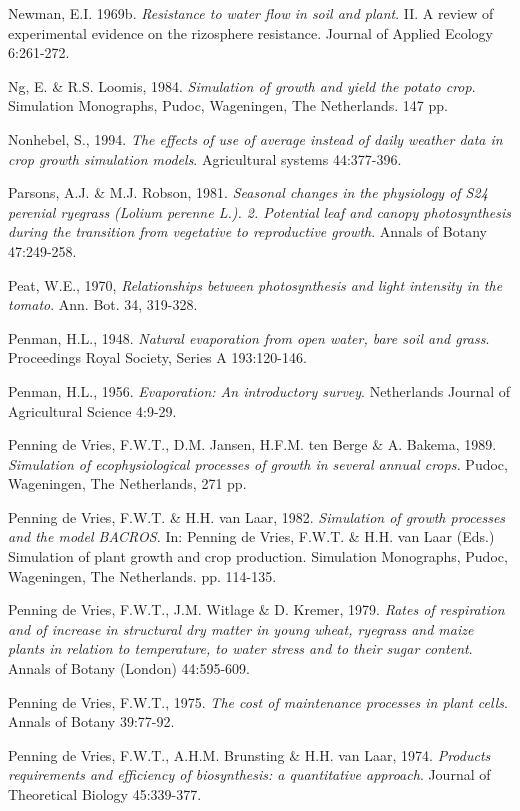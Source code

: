 Newman, E.I. 1969b. {\it Resistance to water flow in soil and plant\/}. II. A review of experimental
evidence on the rizosphere resistance. Journal of Applied Ecology 6:261-272.

Ng, E. \& R.S. Loomis, 1984. {\it Simulation of growth and yield the potato crop\/}. Simulation
Monographs, Pudoc, Wageningen, The Netherlands. 147 pp.

Nonhebel, S., 1994. {\it The effects of use of average instead of daily weather data in crop growth
simulation models\/}. Agricultural systems 44:377-396.

Parsons, A.J. \& M.J. Robson, 1981. {\it Seasonal changes in the  physiology of S24 perenial ryegrass
(Lolium perenne L.). 2. Potential leaf and canopy photosynthesis during the transition from vegetative
to reproductive growth\/}. Annals of Botany 47:249-258.

Peat, W.E., 1970, {\it Relationships between photosynthesis and light intensity in the tomato\/}. Ann. Bot.
34, 319-328.

Penman, H.L., 1948. {\it Natural evaporation from open water, bare soil and grass\/}. Proceedings Royal
Society, Series A 193:120-146.

Penman, H.L., 1956. {\it Evaporation: An introductory survey\/}. Netherlands Journal of Agricultural
Science 4:9-29.

Penning de Vries, F.W.T., D.M. Jansen, H.F.M. ten Berge \& A. Bakema, 1989. {\it Simulation of
ecophysiological processes of growth in several annual crops.\/} Pudoc, Wageningen, The Netherlands,
271 pp.

Penning de Vries, F.W.T. \& H.H. van Laar, 1982. {\it Simulation of growth processes and the model
BACROS. \/}In: Penning de Vries, F.W.T. \& H.H. van Laar (Eds.) Simulation of plant growth and
crop production. Simulation Monographs, Pudoc, Wageningen, The Netherlands. pp. 114-135.

Penning de Vries, F.W.T., J.M. Witlage \& D. Kremer, 1979. {\it Rates of respiration and of increase
in structural dry matter in young wheat, ryegrass and maize plants in relation to temperature, to
water stress and to their sugar content\/}. Annals of Botany (London) 44:595-609.

Penning de Vries, F.W.T., 1975. {\it The cost of maintenance processes in plant cells\/}. Annals of Botany
39:77-92.

Penning de Vries, F.W.T., A.H.M. Brunsting \& H.H. van Laar, 1974. {\it Products requirements and
efficiency of biosynthesis: a quantitative approach\/}. Journal of Theoretical Biology 45:339-377.


